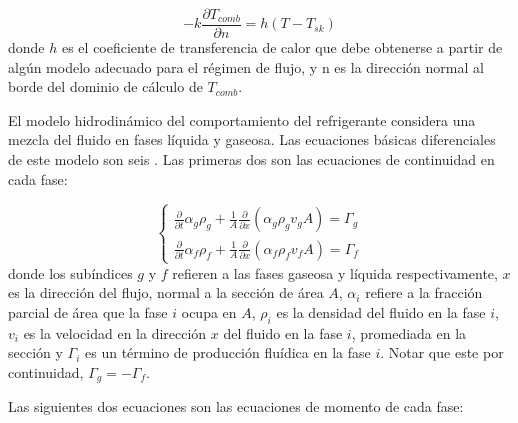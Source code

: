 \begin{equation}
-k \frac{\partial T_{comb}}{\partial n} = h \left ( T - T_{sk} \right )
\label{relap-conveccion}
\end{equation}
donde $h$ es el coeficiente de transferencia de calor que debe obtenerse a partir de algún modelo adecuado para el régimen de flujo,
y n es la dirección normal al borde del dominio de cálculo de $T_{comb}$.

El modelo hidrodinámico del comportamiento del refrigerante considera una mezcla del fluido en fases líquida y gaseosa.
Las ecuaciones básicas diferenciales de este modelo son seis \cite{manual-relap-modelos}.
Las primeras dos son las ecuaciones de continuidad en cada fase:

\begin{equation}
\left \{
\begin{array}{r}
\frac{\partial} {\partial t} \alpha_g \rho_g + \frac{1}{A} \frac{\partial}{\partial x} \left (\alpha_g \rho_g v_g A \right ) = \Gamma_g \\
\frac{\partial} {\partial t} \alpha_f \rho_f + \frac{1}{A} \frac{\partial}{\partial x} \left (\alpha_f \rho_f v_f A \right ) = \Gamma_f
\end{array}
\right .
\label{relap-masa}
\end{equation}
donde los subíndices $g$ y $f$ refieren a las fases gaseosa y líquida respectivamente,
$x$ es la dirección del flujo, normal a la sección de área $A$,
$\alpha_i$ refiere a la fracción parcial de área que la fase $i$ ocupa en $A$,
$\rho_i$ es la densidad del fluido en la fase $i$,
$v_i$ es la velocidad en la dirección $x$ del fluido en la fase $i$, promediada en la sección y
$\Gamma_i$ es un término de producción fluídica en la fase $i$.
Notar que este por continuidad, $\Gamma_g = -\Gamma_f$.

Las siguientes dos ecuaciones son las ecuaciones de momento de cada fase:

